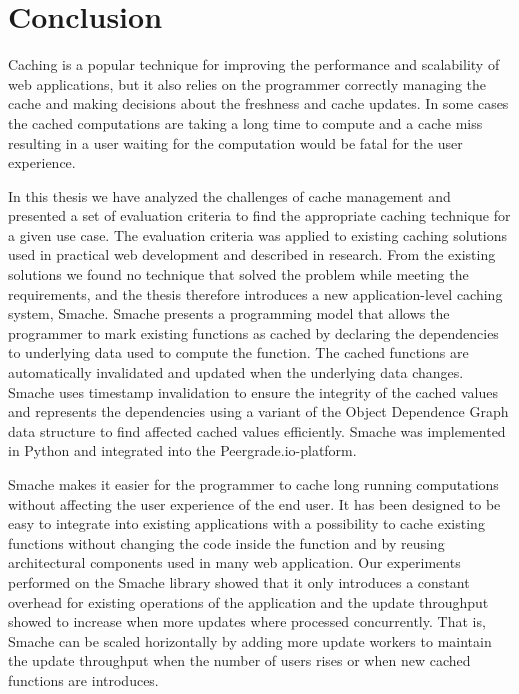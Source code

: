 \chapter{Conclusion}
\label{chapter:conclusion}

Caching is a popular technique for improving the performance and scalability of web applications, but it also relies on the programmer correctly managing the cache and making decisions about the freshness and cache updates. In some cases the cached computations are taking a long time to compute and a cache miss resulting in a user waiting for the computation would be fatal for the user experience.

In this thesis we have analyzed the challenges of cache management and presented a set of evaluation criteria to find the appropriate caching technique for a given use case. The evaluation criteria was applied to existing caching solutions used in practical web development and described in research. From the existing solutions we found no technique that solved the problem while meeting the requirements, and the thesis therefore introduces a new application-level caching system, Smache. Smache presents a programming model that allows the programmer to mark existing functions as cached by declaring the dependencies to underlying data used to compute the function. The cached functions are automatically invalidated and updated when the underlying data changes. Smache uses timestamp invalidation to ensure the integrity of the cached values and represents the dependencies using a variant of the Object Dependence Graph data structure to find affected cached values efficiently. Smache was implemented in Python and integrated into the Peergrade.io-platform.

Smache makes it easier for the programmer to cache long running computations without affecting the user experience of the end user. It has been designed to be easy to integrate into existing applications with a possibility to cache existing functions without changing the code inside the function and by reusing architectural components used in many web application. Our experiments performed on the Smache library showed that it only introduces a constant overhead for existing operations of the application and the update throughput showed to increase when more updates where processed concurrently. That is, Smache can be scaled horizontally by adding more update workers to maintain the update throughput when the number of users rises or when new cached functions are introduces.

